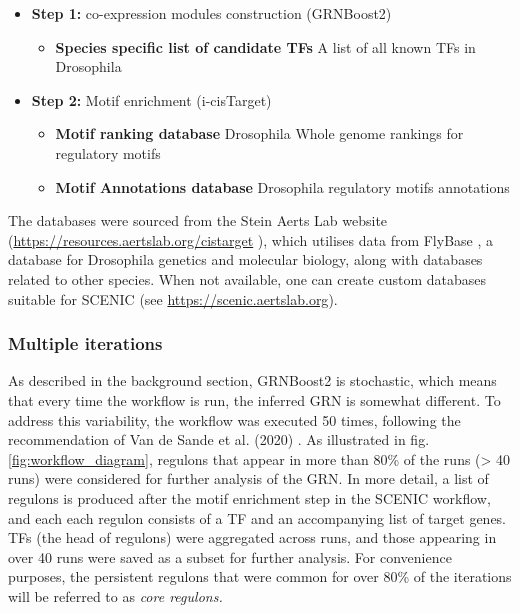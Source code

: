 \begin{itemize}
    \item \textbf{Step 1:} co-expression modules construction (GRNBoost2)
    \begin{itemize}
        \item \textbf{Species specific list of candidate TFs} A list of all known TFs in Drosophila
    \end{itemize}
   \item \textbf{Step 2:} Motif enrichment (i-cisTarget)
   \begin{itemize}
       \item \textbf{Motif ranking database} Drosophila Whole genome rankings for regulatory motifs
       \item \textbf{Motif Annotations database} Drosophila regulatory motifs annotations
   \end{itemize}
\end{itemize}

The databases were sourced from the Stein Aerts Lab website (\url{https://resources.aertslab.org/cistarget} ), 
which utilises data from FlyBase \cite{thurmond2019flybase}, a database for Drosophila genetics and molecular biology, 
along with databases related to other species. When not available, one can create custom databases suitable for SCENIC 
(see \url{https://scenic.aertslab.org}).

\subsubsection{Multiple iterations}
As described in the background section, GRNBoost2 is stochastic, which means that every time the workflow is run, 
the inferred GRN is somewhat different. To address this variability, the workflow was executed 50 times, following the 
recommendation of Van de Sande et al. (2020)  \cite{van2020scalable}. As illustrated in fig. \ref{fig:workflow_diagram}, 
regulons that appear in more than 80\% of the runs (> 40 runs) were considered for further analysis of the GRN. In more detail, 
a list of regulons is produced after the motif enrichment step in the SCENIC workflow, and each each regulon consists of a 
TF and an accompanying list of target genes. TFs (the head of regulons)  were aggregated across runs, and those appearing 
in over 40 runs were saved as a subset for further analysis.
For convenience purposes, the persistent regulons that were common for over 80\% of the iterations will be referred to as 
\textit{core regulons.}

